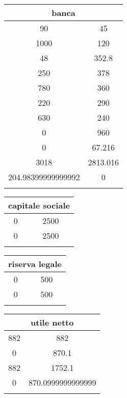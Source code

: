 \documentclass[twocolumn]{article}
\begin{document}
\begin{table}[ht]\centering 
\begin{tabular}{|c|c|}
\hline
\multicolumn{2}{|c|}{banca} \\ 
\hline 90 & 45 \\ 
1000 & 120 \\ 
48 & 352.8 \\ 
250 & 378 \\ 
780 & 360 \\ 
220 & 290 \\ 
630 & 240 \\ 
0 & 960 \\ 
0 & 67.216 \\ 
 \hline 
3018 & 2813.016 \\ 
\hline
204.98399999999992 & 0 \\ 
 \\ 
\hline
\end{tabular} \end{table} 
\begin{table}[ht]\centering 
\begin{tabular}{|c|c|}
\hline
\multicolumn{2}{|c|}{capitale sociale} \\ 
\hline  \hline 
0 & 2500 \\ 
\hline
0 & 2500 \\ 
 \\ 
\hline
\end{tabular} \end{table} 
\begin{table}[ht]\centering 
\begin{tabular}{|c|c|}
\hline
\multicolumn{2}{|c|}{riserva legale} \\ 
\hline  \hline 
0 & 500 \\ 
\hline
0 & 500 \\ 
 \\ 
\hline
\end{tabular} \end{table} 
\begin{table}[ht]\centering 
\begin{tabular}{|c|c|}
\hline
\multicolumn{2}{|c|}{utile netto} \\ 
\hline 882 & 882 \\ 
0 & 870.1 \\ 
 \hline 
882 & 1752.1 \\ 
\hline
0 & 870.0999999999999 \\ 
 \\ 
\hline
\end{tabular} \end{table} 
\end{document}
